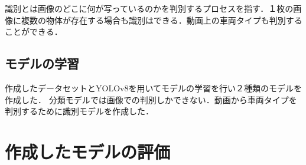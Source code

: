 \begin{multicols*}{2}
識別とは画像のどこに何が写っているのかを判別するプロセスを指す．１枚の画像に複数の物体が存在する場合も識別はできる．動画上の車両タイプも判別することができる．


\subsection{モデルの学習}
作成したデータセットとYOLOv8を用いてモデルの学習を行い２種類のモデルを作成した．
分類モデルでは画像での判別しかできない．動画から車両タイプを判別するために識別モデルを作成した．




\section{作成したモデルの評価}


\end{multicols*}
